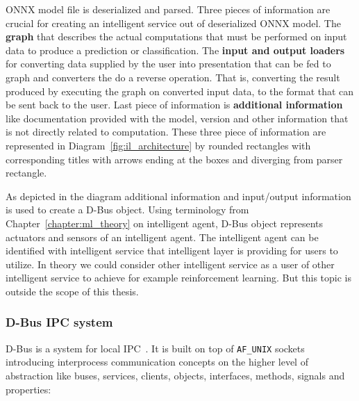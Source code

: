 \documentclass[english, 12pt, a4paper, elec, utf8, online]{aaltothesis}
\begin{document}
ONNX model file is deserialized and parsed. Three pieces of information are crucial for creating an intelligent service out of deserialized ONNX model. The \textbf{graph} that describes the actual computations that must be performed on input data to produce a prediction or classification. The \textbf{input and output loaders} for converting data supplied by the user into presentation that can be fed to graph and converters the do a reverse operation. That is, converting the result produced by executing the graph on converted input data, to the format that can be sent back to the user. Last piece of information is \textbf{additional information} like documentation provided with the model, version and other information that is not directly related to computation. These three piece of information are represented in Diagram~\ref{fig:il_architecture} by rounded rectangles with corresponding titles with arrows ending at the boxes and diverging from parser rectangle. 

As depicted in the diagram additional information and input/output information is used to create a D-Bus object. Using terminology from Chapter~\ref{chapter:ml_theory} on intelligent agent, D-Bus object represents actuators and sensors of an intelligent agent. The intelligent agent can be identified with intelligent service that intelligent layer is providing for users to utilize. In theory we could consider other intelligent service as a user of other intelligent service to achieve for example reinforcement learning. But this topic is outside the scope of this thesis.           

\subsubsection{D-Bus IPC system}
D-Bus is a system for local IPC~\cite{dbus_spec}. It is built on top of \texttt{AF\_UNIX} sockets introducing interprocess communication concepts on the higher level of abstraction  like buses, services, clients, objects, interfaces, methods, signals and properties:  
    
\end{document}
